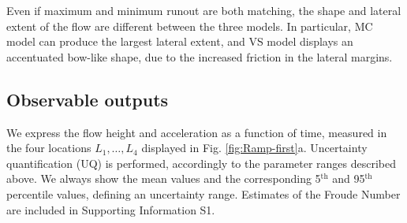 \documentclass{article}
\begin{document}
Even if maximum and minimum runout are both matching, the shape and lateral extent of the flow are different between the three models. In particular, MC model can produce the largest lateral extent, and VS model displays an accentuated bow-like shape, due to the increased friction in the lateral margins.

\subsection{Observable outputs} \label{Obs1}
We express the flow height and acceleration as a function of time, measured in the four locations $L_1,\dots, L_4$ displayed in Fig. \ref{fig:Ramp-first}a. Uncertainty quantification (UQ) is performed, accordingly to the parameter ranges described above. We always show the mean values and the corresponding 5$^{\mathrm{th}}$ and 95$^{\mathrm{th}}$ percentile values, defining an uncertainty range. Estimates of the Froude Number are included in Supporting Information S1.
\end{document}
